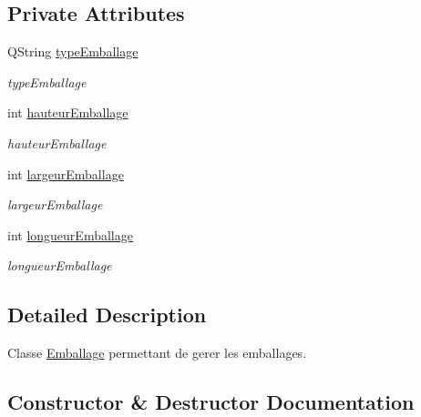 \subsection*{Private Attributes}
\begin{DoxyCompactItemize}
\item 
\mbox{\label{class_emballage_a1a939a1b7ff146dbcfe585a59f53174c}} 
Q\+String \mbox{\hyperlink{class_emballage_a1a939a1b7ff146dbcfe585a59f53174c}{type\+Emballage}}
\begin{DoxyCompactList}\small\item\em type\+Emballage \end{DoxyCompactList}\item 
\mbox{\label{class_emballage_a8fdf2bff797b5405db34cbb365f02642}} 
int \mbox{\hyperlink{class_emballage_a8fdf2bff797b5405db34cbb365f02642}{hauteur\+Emballage}}
\begin{DoxyCompactList}\small\item\em hauteur\+Emballage \end{DoxyCompactList}\item 
\mbox{\label{class_emballage_a1fe866728576ec8ee38a0c647e1f1bab}} 
int \mbox{\hyperlink{class_emballage_a1fe866728576ec8ee38a0c647e1f1bab}{largeur\+Emballage}}
\begin{DoxyCompactList}\small\item\em largeur\+Emballage \end{DoxyCompactList}\item 
\mbox{\label{class_emballage_a4c9b0f9c3e617eceac9f557177356e85}} 
int \mbox{\hyperlink{class_emballage_a4c9b0f9c3e617eceac9f557177356e85}{longueur\+Emballage}}
\begin{DoxyCompactList}\small\item\em longueur\+Emballage \end{DoxyCompactList}\end{DoxyCompactItemize}


\subsection{Detailed Description}
Classe \mbox{\hyperlink{class_emballage}{Emballage}} permettant de gerer les emballages. 

\subsection{Constructor \& Destructor Documentation}
\mbox{\label{class_emballage_ae74a1117a30e239442418bb49a69db47}} 
